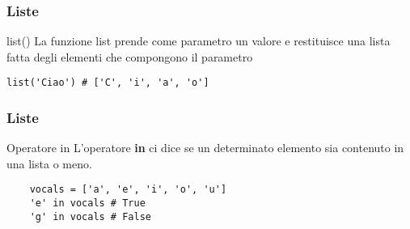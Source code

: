 \begin{frame}[fragile]
\frametitle{Liste}
    \begin{block}{list()}
    La funzione list prende come parametro un valore e restituisce una lista fatta degli elementi che compongono il parametro
    \end{block}
    
    \begin{lstlisting}
list('Ciao') # ['C', 'i', 'a', 'o']
    \end{lstlisting}
\end{frame}

\begin{frame}[fragile]
\frametitle{Liste}
    \begin{block}{Operatore in}
    L'operatore \textbf{in} ci dice se un determinato elemento sia contenuto in una lista o meno.
    \end{block}
    
    \begin{lstlisting}
    vocals = ['a', 'e', 'i', 'o', 'u']
    'e' in vocals # True
    'g' in vocals # False
    \end{lstlisting}
\end{frame}
